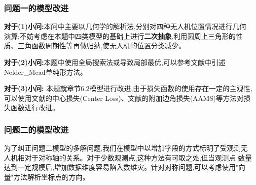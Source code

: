 \documentclass[withoutpreface,bwprint]{cumcmthesis} %
\begin{document}
	\subsubsection{问题一的模型改进}
	 	
	 		\textbf{对于(1)小问:\quad}本问中主要以几何学的解析法,分别对四种无人机位置情况进行几何演算;不妨考虑在本题中四类模型的基础上进行\textbf{二次抽象},利用圆周上三角形的性质、三角函数周期性等再做归纳,使无人机的位置分类减少。
	 	
	 		\textbf{对于(2)小问:\quad}本题中使用全局搜索法或导致局部最优,可以参考文献\cite{singer2009nelder}中引述Nelder\_Mead单纯形方法。
	 		
	 		\textbf{对于(3)小问:\quad} 本题就章节6.2模型进行改进,由于损失函数的使用存在一定的主观性,可以使用文献\cite{cai2018exploring}的中心损失(Center Loss)、文献\cite{deng2019arcface}的附加边角损失(AAMS)等方法对损失函数进行改进。
	\subsubsection{问题二的模型改进}	
		
			为了纠正问题二模型的多解问题,我们在模型中以增加字段的方式标明了受观测无人机相对于对称轴的关系。对于少数观测点,这种方法有可取之处,但当观测点
			数量达到一定规模后,增加数据维度容易陷入数维灾。针对对称问题,可以考虑使用"向量"方法解析坐标点的方向。
			
\end{document}
